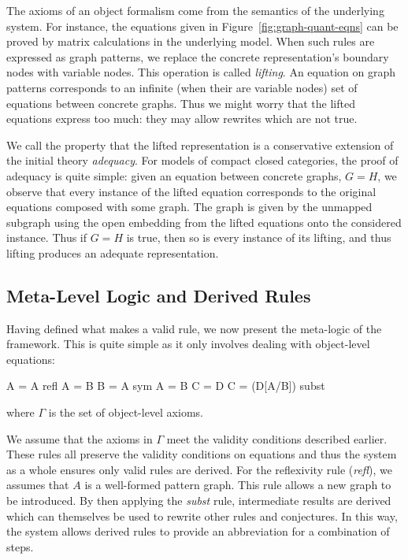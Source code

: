 \documentclass[runningheads]{llncs}
\begin{document}
The axioms of an object formalism come from the semantics of the
underlying system. For instance, the equations given in
Figure~\ref{fig:graph-quant-eqns} can be proved by matrix
calculations in the underlying model. When such rules are expressed
as graph patterns, we replace the concrete representation's boundary
nodes with variable nodes. This operation is called \emph{lifting}. An
equation on graph patterns corresponds to an infinite (when their are
variable nodes) set of equations between concrete graphs. Thus we
might worry that the lifted equations express too much: they may allow
rewrites which are not true.

We call the property that the lifted representation is a conservative
extension of the initial theory \emph{adequacy}. For models of compact
closed categories, the proof of adequacy is quite simple: given an
equation between concrete graphs, $G = H$, we observe that every
instance of the lifted equation corresponds to the original equations
composed with some graph. The graph is given by the unmapped subgraph
using the open embedding from the lifted equations onto the considered
instance. Thus if $G = H$ is true, then so is every instance of its
lifting, and thus lifting produces an adequate representation.

\subsection{Meta-Level Logic and Derived Rules}

Having defined what makes a valid rule, we now present the meta-logic
of the framework. This is quite simple as it only involves dealing
with object-level equations:

\begin{center}
\prooftree
\justifies
\Gamma \vdash A = A
\using\mbox{refl}
\endprooftree 
\quad\quad
\prooftree
\Gamma \vdash A = B
\justifies
\Gamma \vdash B = A
\using\mbox{sym}
\endprooftree
\quad\quad
\prooftree
\Gamma \vdash A = B \quad\quad
\Gamma \vdash C = D
\justifies
\Gamma \vdash C = (D[A/B])
\using\mbox{subst}
\endprooftree
\end{center}

\noindent where $\Gamma$ is the set of object-level axioms. 

We assume that the axioms in $\Gamma$ meet the validity conditions
described earlier. These rules all preserve the validity conditions on
equations and thus the system as a whole ensures only valid rules are
derived. For the reflexivity rule (\emph{refl}), we assumes that $A$
is a well-formed pattern graph. This rule allows a new graph to be
introduced. By then applying the \emph{subst} rule, intermediate
results are derived which can themselves be used to rewrite other
rules and conjectures.  In this way, the system allows derived rules
to provide an abbreviation for a combination of steps.
\end{document}
